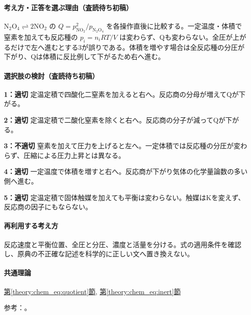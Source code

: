 \paragraph{考え方・正答を選ぶ理由（査読待ち初稿）} \(\mathrm{N_2O_4\rightleftharpoons2NO_2}\) の \(Q=p_{\mathrm{NO_2}}^2/p_{\mathrm{N_2O_4}}\) を各操作直後に比較する。一定温度・体積で窒素を加えても反応種の \(p_i=n_iRT/V\) は変わらず、Qも変わらない。全圧が上がるだけで左へ進むとする3が誤りである。体積を増やす場合は全反応種の分圧が下がり、Qは体積に反比例して下がるため右へ進む。

\paragraph{選択肢の検討（査読待ち初稿）}\mbox{}\par

\noindent\textbf{1：適切} 定温定積で四酸化二窒素を加えると右へ。反応商の分母が増えてQが下がる。\par

\noindent\textbf{2：適切} 定温定積で二酸化窒素を除くと右へ。反応商の分子が減ってQが下がる。\par

\noindent\textbf{3：不適切} 窒素を加えて圧力を上げると左へ。一定体積では反応種の分圧が変わらず、圧縮による圧力上昇とは異なる。\par

\noindent\textbf{4：適切} 一定温度で体積を増すと右へ。反応商が下がり気体の化学量論数の多い側へ進む。\par

\noindent\textbf{5：適切} 定温定積で固体触媒を加えても平衡は変わらない。触媒はKを変えず、反応商の因子にもならない。\par

\paragraph{再利用する考え方} 反応速度と平衡位置、全圧と分圧、濃度と活量を分ける。式の適用条件を確認し、原典の不正確な記述を科学的に正しい文へ置き換えない。

\paragraph{共通理論} \hyperref[theory:chem_eq:quotient]{第\ref*{theory:chem_eq:quotient}節}, \hyperref[theory:chem_eq:inert]{第\ref*{theory:chem_eq:inert}節}

\par 参考：\cite{iupac_greenbook2012}。

